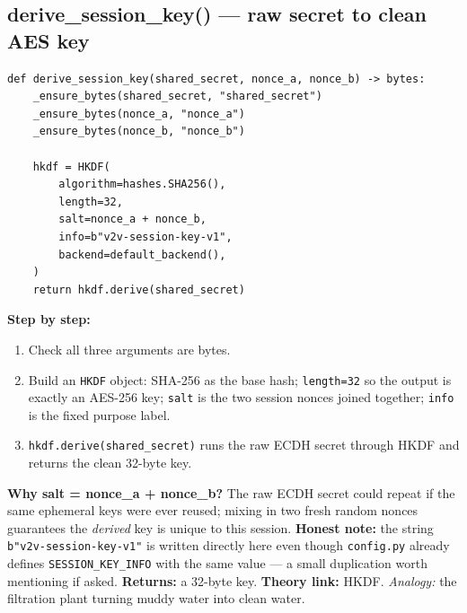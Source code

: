 \documentclass[11pt,a4paper]{report}
\begin{document}
\subsection{derive\_session\_key() --- raw secret to clean AES key}
\begin{lstlisting}[style=py,caption={crypto.py --- HKDF key derivation.}]
def derive_session_key(shared_secret, nonce_a, nonce_b) -> bytes:
    _ensure_bytes(shared_secret, "shared_secret")
    _ensure_bytes(nonce_a, "nonce_a")
    _ensure_bytes(nonce_b, "nonce_b")

    hkdf = HKDF(
        algorithm=hashes.SHA256(),
        length=32,
        salt=nonce_a + nonce_b,
        info=b"v2v-session-key-v1",
        backend=default_backend(),
    )
    return hkdf.derive(shared_secret)
\end{lstlisting}
\textbf{Step by step:}
\begin{enumerate}
  \item Check all three arguments are bytes.
  \item Build an \texttt{HKDF} object: SHA-256 as the base hash;
        \texttt{length=32} so the output is exactly an AES-256 key;
        \texttt{salt} is the two session nonces joined together;
        \texttt{info} is the fixed purpose label.
  \item \texttt{hkdf.derive(shared\_secret)} runs the raw ECDH secret through
        HKDF and returns the clean 32-byte key.
\end{enumerate}
\textbf{Why salt = nonce\_a + nonce\_b?} The raw ECDH secret could repeat if the
same ephemeral keys were ever reused; mixing in two fresh random nonces
guarantees the \emph{derived} key is unique to this session.
\textbf{Honest note:} the string \texttt{b"v2v-session-key-v1"} is written
directly here even though \texttt{config.py} already defines
\texttt{SESSION\_KEY\_INFO} with the same value --- a small duplication worth
mentioning if asked. \textbf{Returns:} a 32-byte key. \textbf{Theory link:} HKDF.
\emph{Analogy:} the filtration plant turning muddy water into clean water.
\end{document}
